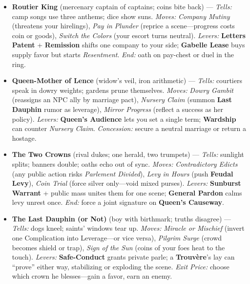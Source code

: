 \begin{itemize}
  \item \textbf{Routier King} (mercenary captain of captains; coins bite back) --- \emph{Tells:} camp songs use three anthems; dice show suns. \emph{Moves:} \emph{Company Mutiny} (threatens your hirelings), \emph{Pay in Plunder} (reprice a scene—progress costs coin or goods), \emph{Switch the Colors} (your escort turns neutral). \emph{Levers:} \textbf{Letters Patent} + \textbf{Remission} shifts one company to your side; \textbf{Gabelle Lease} buys supply favor but starts \emph{Resentment}. \emph{End:} oath on pay-chest or duel in the ring.
  
  \item \textbf{Queen-Mother of Lence} (widow’s veil, iron arithmetic) --- \emph{Tells:} courtiers speak in dowry weights; gardens prune themselves. \emph{Moves:} \emph{Dowry Gambit} (reassigns an NPC ally by marriage pact), \emph{Nursery Claim} (summon \textbf{Last Dauphin} rumor as leverage), \emph{Mirror Progress} (reflect a success as her policy). \emph{Levers:} \textbf{Queen’s Audience} lets you set a single term; \textbf{Wardship} can counter \emph{Nursery Claim}. \emph{Concession:} secure a neutral marriage or return a hostage.
  
  \item \textbf{The Two Crowns} (rival dukes; one herald, two trumpets) --- \emph{Tells:} sunlight splits; banners double; oaths echo out of sync. \emph{Moves:} \emph{Contradictory Edicts} (any public action risks \emph{Parlement Divided}), \emph{Levy in Hours} (push \textbf{Feudal Levy}), \emph{Coin Trial} (force silver only—void mixed purses). \emph{Levers:} \textbf{Sunburst Warrant} + public mass unites them for one scene; \textbf{General Pardon} calms levy unrest once. \emph{End:} force a joint signature on \textbf{Queen’s Causeway}.
  
  \item \textbf{The Last Dauphin (or Not)} (boy with birthmark; truths disagree) --- \emph{Tells:} dogs kneel; saints’ windows tear up. \emph{Moves:} \emph{Miracle or Mischief} (invert one Complication into Leverage—or vice versa), \emph{Pilgrim Surge} (crowd becomes shield or trap), \emph{Sign of the Sun} (coins of your foes heat to the touch). \emph{Levers:} \textbf{Safe-Conduct} grants private parle; a \textbf{Trouvère}’s lay can “prove” either way, stabilizing or exploding the scene. \emph{Exit Price:} choose which crown he blesses—gain a favor, earn an enemy.
\end{itemize}

